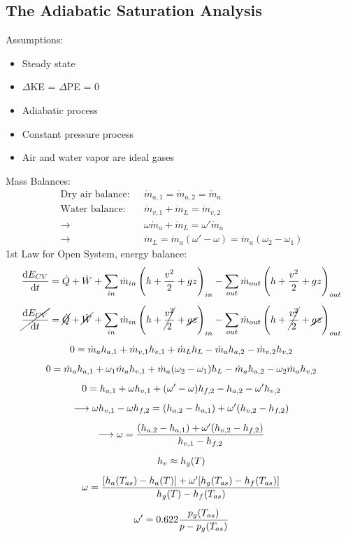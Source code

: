 \documentclass[class=report, crop=false, 12pt,a4paper]{standalone}
\numberwithin{equation}{section}
\begin{document}
\subsection{The Adiabatic Saturation Analysis}
Assumptions:
\begin{itemize}[noitemsep]
  \item Steady state
  \item $\Delta$KE = $\Delta$PE = 0
  \item Adiabatic process
  \item Constant pressure process
  \item Air and water vapor are ideal gases
\end{itemize}
Mass Balances:
\begin{align}
  \text{Dry air balance:} \ \ \ &\dot{m}_{a,1} = \dot{m}_{a,2} = \dot{m}_a \\[5pt]
  \text{Water balance:} \ \ \ &\dot{m}_{v,1} + \dot{m}_L = \dot{m}_{v,2} \\[5pt]
  \longrightarrow \ \ \ &\omega\dot{m}_a + \dot{m}_L = \omega'\dot{m}_a \\[5pt]
  \longrightarrow \ \ \ &\dot{m}_L = \dot{m}_a(\omega'-\omega) = \dot{m}_a(\omega_2-\omega_1)
\end{align}
1st Law for Open System, energy balance:
\begin{gather}
  \frac{\dif E_{CV}}{\dif t} = \dot{Q} + \dot{W} + \sum_{in}\dot{m}_{in}\left(h+\frac{v^2}{2}+gz\right)_{in} - \sum_{out}\dot{m}_{out}\left(h+\frac{v^2}{2}+gz\right)_{out} \\[5pt]
  \cancel{\frac{\dif E_{CV}}{\dif t}} = \cancel{\dot{Q}} + \cancel{\dot{W}} + \sum_{in}\dot{m}_{in}\left(h+\cancel{\frac{v^2}{2}}+\cancel{gz}\right)_{in} - \sum_{out}\dot{m}_{out}\left(h+\cancel{\frac{v^2}{2}}+\cancel{gz}\right)_{out} \\[5pt]
  0 = \dot{m}_{a}h_{a,1} + \dot{m}_{v,1}h_{v,1} + \dot{m}_{L}h_{L} - \dot{m}_{a}h_{a,2} - \dot{m}_{v,2}h_{v,2} \\[5pt]
  0 = \dot{m}_{a}h_{a,1} + \omega_{1}\dot{m}_{a}h_{v,1} + \dot{m}_{a}(\omega_2 - \omega_1)h_{L} - \dot{m}_{a}h_{a,2} - \omega_2\dot{m}_{a}h_{v,2} \\[5pt]
  0 = h_{a,1} + \omega h_{v,1} + (\omega'-\omega)h_{f,2} - h_{a,2} - \omega'h_{v,2} \\[5pt]
  \longrightarrow \omega h_{v,1} - \omega h_{f,2} = (h_{a,2} - h_{a,1}) + \omega'(h_{v,2} - h_{f,2}) \\[5pt]
  \longrightarrow \omega = \frac{(h_{a,2} - h_{a,1}) + \omega'(h_{v,2} - h_{f,2})}{h_{v,1} - h_{f,2}} \\[5pt]
  h_v \approx h_g(T) \\[5pt]
  \omega = \frac{[h_a(T_{as}) - h_a(T)] + \omega'[h_g(T_{as}) - h_f(T_{as})]}{h_g(T) - h_f(T_{as})} \\[5pt]
  \omega' = 0.622\frac{p_g(T_{as})}{p - p_g(T_{as})}
\end{gather}
\end{document}
